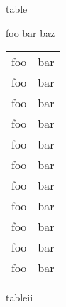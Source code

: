 \documentclass{leporello}
\begin{document}
\begin{leporellocolumn}{table}
\begin{leporellobox}[flow into={tableb}, background color=cyan, stretch]

\bfseries
\lipsum[1]


\lipsum[3] foo bar baz

\begin{longtable}{ll}
 foo & bar \\
 foo & bar \\
 foo & bar \\
 foo & bar \\
 foo & bar \\ 
 foo & bar \\
 foo & bar \\
 foo & bar \\
 foo & bar \\
 foo & bar \\
 foo & bar \\
\end{longtable}
\end{leporellobox}
\end{leporellocolumn}

\begin{leporellocolumn}{tableii}
\begin{leporellobox}[name={tableb}, background color=cyan]
\end{leporellobox}
\end{leporellocolumn}



\end{document}
